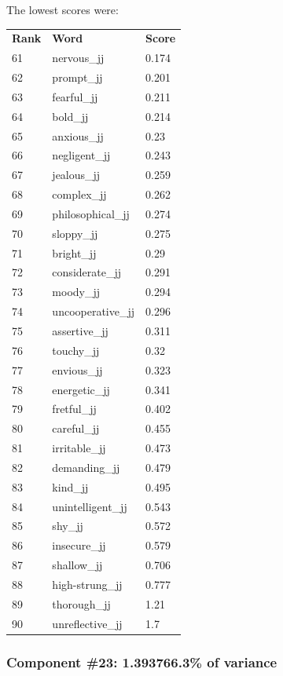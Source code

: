 \documentclass[10pt,letterpaper]{book}
\begin{document}
The lowest scores were:
\begin{tabular}{ l l l }
        \textbf{Rank} & \textbf{Word} & \textbf{Score} \\
        61 & nervous\_jj & 0.174 \\
        62 & prompt\_jj & 0.201 \\
        63 & fearful\_jj & 0.211 \\
        64 & bold\_jj & 0.214 \\
        65 & anxious\_jj & 0.23 \\
        66 & negligent\_jj & 0.243 \\
        67 & jealous\_jj & 0.259 \\
        68 & complex\_jj & 0.262 \\
        69 & philosophical\_jj & 0.274 \\
        70 & sloppy\_jj & 0.275 \\
        71 & bright\_jj & 0.29 \\
        72 & considerate\_jj & 0.291 \\
        73 & moody\_jj & 0.294 \\
        74 & uncooperative\_jj & 0.296 \\
        75 & assertive\_jj & 0.311 \\
        76 & touchy\_jj & 0.32 \\
        77 & envious\_jj & 0.323 \\
        78 & energetic\_jj & 0.341 \\
        79 & fretful\_jj & 0.402 \\
        80 & careful\_jj & 0.455 \\
        81 & irritable\_jj & 0.473 \\
        82 & demanding\_jj & 0.479 \\
        83 & kind\_jj & 0.495 \\
        84 & unintelligent\_jj & 0.543 \\
        85 & shy\_jj & 0.572 \\
        86 & insecure\_jj & 0.579 \\
        87 & shallow\_jj & 0.706 \\
        88 & high-strung\_jj & 0.777 \\
        89 & thorough\_jj & 1.21 \\
        90 & unreflective\_jj & 1.7 \\
\end{tabular}
\subsubsection{Component \#23: 1.393766.3\% of variance}
\end{document}
